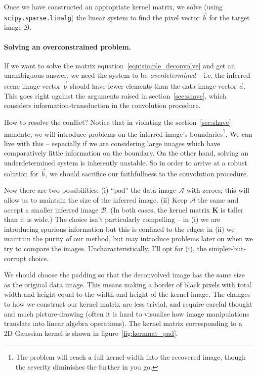 \documentclass[letterpaper, 11pt]{article}
\begin{document}
Once we have constructed an appropriate kernel matrix, we solve (using \texttt{scipy.sparse.linalg}) the linear system to find the pixel vector $\vec b$ for the target image $\mathcal B$.

\paragraph{Solving an overconstrained problem.} If we want to solve the matrix equation~\ref{eqn:simple_deconvolve} and get an unambiguous answer, we need the system to be \emph{overdetermined} -- i.e. the inferred scene image-vector $\vec b$ should have fewer elements than the data image-vector $\vec a$. This goes right against the arguments raised in section~\ref{sec:shave}, which considers information-transduction in the convolution procedure.

How to resolve the conflict? Notice that in violating the section~\ref{sec:shave} mandate, we will introduce problems on the inferred image's boundaries\footnote{The problem will reach a full kernel-width into the recovered image, though the severity diminishes the further in you go.}. We can live with this -- especially if we are considering large images which have comparatively little information on the boundary. On the other hand, solving an underdetermined system is inherently unstable. So in order to arrive at a robust solution for $\vec b$, we should sacrifice our faithfullness to the convolution procedure.

Now there are two possibilities: (i) ``pad'' the data image $\mathcal A$ with zeroes; this will allow us to maintain the size of the inferred image. (ii) Keep $\mathcal A$ the same and accept a smaller inferred image $\mathcal B$. (In both cases, the kernel matrix $\mathbf K$ is taller than it is wide.) The choice isn't particularly compelling -- in (i) we are introducing spurious information but this is confined to the edges; in (ii) we maintain the purity of our method, but may introduce problems later on when we try to compare the images. Uncharacteristically, I'll opt for (i), the simpler-but-corrupt choice.

We should choose the padding so that the deconvolved image has the same size as the original data image. This means making a border of black pixels with total width and height equal to the width and height of the kernel image. The changes to how we construct our kernel matrix are less trivial, and require careful thought and much picture-drawing (often it is hard to visualise how image manipulations translate into linear algebra operations). The kernel matrix corresponding to a 2D Gaussian kernel is shown in figure~\ref{fig:kernmat_pad}.
\end{document}
